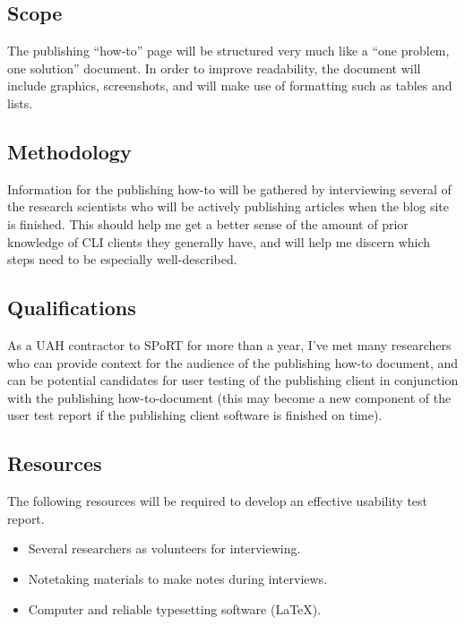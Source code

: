 \documentclass[12pt]{article}
\begin{document}
\subsection{Scope}

The publishing ``how-to'' page will be structured very much like a ``one problem, one solution'' document. In order to improve readability, the document will include graphics, screenshots, and will make use of formatting such as tables and lists.

\subsection{Methodology}

Information for the publishing how-to will be gathered by interviewing several of the research scientists who will be actively publishing articles when the blog site is finished. This should help me get a better sense of the amount of prior knowledge of CLI clients they generally have, and will help me discern which steps need to be especially well-described.

\subsection{Qualifications}

As a UAH contractor to SPoRT for more than a year, I've met many researchers who can provide context for the audience of the publishing how-to document, and can be potential candidates for user testing of the publishing client in conjunction with the publishing how-to-document (this may become a new component of the user test report if the publishing client software is finished on time).

\subsection{Resources}

The following resources will be required to develop an effective usability test report.

\begin{itemize}
	\item{Several researchers as volunteers for interviewing.}
	\item{Notetaking materials to make notes during interviews.}
	\item{Computer and reliable typesetting software (\LaTeX).}
\end{itemize}
\end{document}
